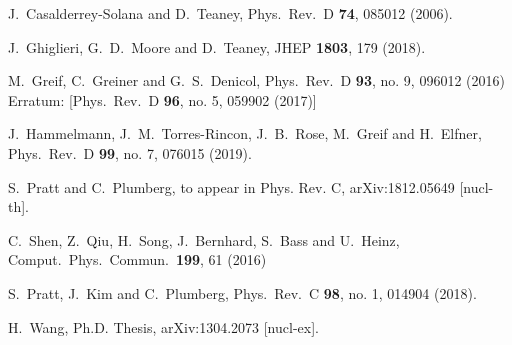 \documentclass[aps,prc,nofootinbib,showpacs,superscriptaddress,groupedaddress]{revtex4-1}
\begin{document}
\begin{thebibliography}{99}
  J.~Casalderrey-Solana and D.~Teaney,
  Phys.\ Rev.\ D {\bf 74}, 085012 (2006).

  J.~Ghiglieri, G.~D.~Moore and D.~Teaney,
  JHEP {\bf 1803}, 179 (2018).
  
  
  M.~Greif, C.~Greiner and G.~S.~Denicol,
  Phys.\ Rev.\ D {\bf 93}, no. 9, 096012 (2016)
  Erratum: [Phys.\ Rev.\ D {\bf 96}, no. 5, 059902 (2017)]
  
  J.~Hammelmann, J.~M.~Torres-Rincon, J.~B.~Rose, M.~Greif and H.~Elfner,
  Phys.\ Rev.\ D {\bf 99}, no. 7, 076015 (2019).

  S.~Pratt and C.~Plumberg,
  to appear in Phys. Rev. C, arXiv:1812.05649 [nucl-th].

  C.~Shen, Z.~Qiu, H.~Song, J.~Bernhard, S.~Bass and U.~Heinz,
  Comput.\ Phys.\ Commun.\  {\bf 199}, 61 (2016)

  S.~Pratt, J.~Kim and C.~Plumberg,
  Phys.\ Rev.\ C {\bf 98}, no. 1, 014904 (2018).

  H.~Wang, Ph.D. Thesis,
  arXiv:1304.2073 [nucl-ex].


\end{thebibliography}
\end{document}
